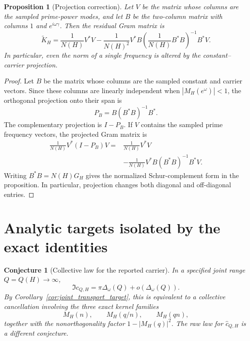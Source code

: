 \documentclass[11pt]{amsart}
\numberwithin{equation}{section}
\theoremstyle{plain}
\newtheorem{proposition}[theorem]{Proposition}
\newtheorem{conjecture}[theorem]{Conjecture}
\theoremstyle{definition}
\theoremstyle{remark}
\newcommand{\1}{\mathbf{1}}
\begin{document}
\begin{proposition}[Projection correction]
\label{prop:projection_correction_detailed}
Let $V$ be the matrix whose columns are the sampled prime-power modes, and
let $B$ be the two-column matrix with columns $1$ and $e^{i\omega\gamma}$.
Then the residual Gram matrix is
\begin{equation}
\widetilde K_H
=
\frac1{N(H)}V^\ast V
-
\frac1{N(H)^2}
V^\ast B
\left(\frac1{N(H)}B^\ast B\right)^{-1}
B^\ast V.
\label{eq:matrix_schur_projection}
\end{equation}
In particular, even the norm of a single frequency is altered by the
constant--carrier projection.
\end{proposition}

\begin{proof}
Let \(B\) be the matrix whose columns are the sampled constant and carrier
vectors.  Since these columns are linearly independent when
\(|M_H(e^\omega)|<1\), the orthogonal projection onto their span is
\begin{equation}
P_B=B(B^\ast B)^{-1}B^\ast.
\label{eq:projection_PB_detailed}
\end{equation}
The complementary projection is \(I-P_B\).  If \(V\) contains the sampled
prime frequency vectors, the projected Gram matrix is
\begin{align}
\frac1{N(H)}V^\ast(I-P_B)V
={}&
\frac1{N(H)}V^\ast V
\label{eq:projection_gram_one}
\\
&-
\frac1{N(H)}V^\ast B(B^\ast B)^{-1}B^\ast V.
\label{eq:projection_gram_two}
\end{align}
Writing \(B^\ast B=N(H)G_H\) gives the normalized Schur-complement form in
the proposition.  In particular, projection changes both diagonal and
off-diagonal entries.
\end{proof}

\section{Analytic targets isolated by the exact identities}
\label{sec:analytic_targets}

\begin{conjecture}[Collective law for the reported carrier]
\label{conj:collective_carrier_law}
In a specified joint range \(Q=Q(H)\to\infty\),
\begin{equation}
\Im c_{Q,H}
=
\pi\Delta_\omega(Q)
+
o\left(\Delta_\omega(Q)\right).
\label{eq:collective_carrier_law}
\end{equation}
By Corollary~\ref{cor:joint_transport_target}, this is equivalent to a
collective cancellation involving the three exact kernel families
\[
M_H(n),\qquad M_H(q/n),\qquad M_H(qn),
\]
together with the nonorthogonality factor
\(1-|M_H(q)|^2\).  The raw law for \(\widehat c_{Q,H}\) is a different
conjecture.
\end{conjecture}
\end{document}
